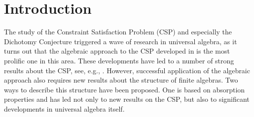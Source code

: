 \documentclass[11pt]{article}
\begin{document}
\section{Introduction}\label{sec:introduction}

The study of the Constraint Satisfaction Problem (CSP) and especially the Dichotomy 
Conjecture triggered a wave of research in universal algebra, as it turns out that the
algebraic approach to the CSP developed in \cite{Bulatov05:classifying,Jeavons97:closure}
is the most prolific one in this area. These developments have led to a number of strong results
about the CSP, see, e.g., \cite{Barto11:conservative,Barto14:local,Barto12:near,Bulatov06:3-element,Bulatov11:conservative,Bulatov14:conservative,Bulatov06:simple,Idziak10:few}. However, successful application of the algebraic approach also requires new results 
about the structure of finite algebras. Two ways to describe this structure have been 
proposed. One is based on absorption properties \cite{Barto15:constraint,Barto12:absorbing}
and has led not only to new results on the CSP, but also to significant developments in
universal algebra itself.
\end{document}

